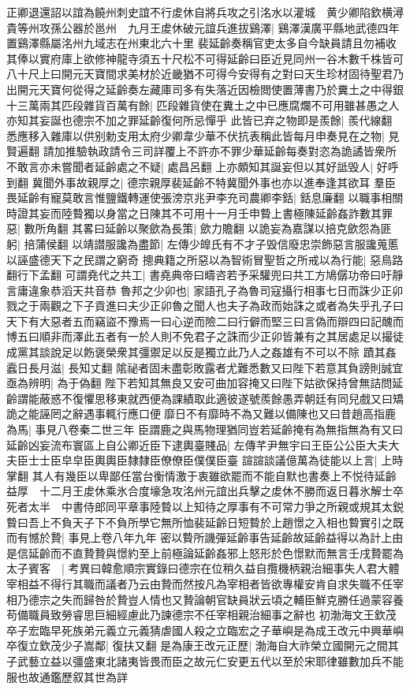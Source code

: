 正卿退還詔以誼為饒州刺史誼不行䖍休自將兵攻之引洺水以灌城　黄少卿陷欽横潯貴等州攻孫公器於邕州　九月王䖍休破元誼兵進拔鷄澤|{
	鷄澤漢廣平縣地武德四年置鷄澤縣屬洺州九域志在州東北六十里}
裴延齡奏稱官吏太多自今缺員請且勿補收其俸以實府庫上欲修神龍寺須五十尺松不可得延齡曰臣近見同州一谷木數千株皆可八十尺上曰開元天寶間求美材於近畿猶不可得今安得有之對曰天生珍材固待聖君乃出開元天寶何從得之延齡奏左藏庫司多有失落近因檢閲使置薄書乃於糞土之中得銀十三萬兩其匹段雜貨百萬有餘|{
	匹段雜貨使在糞土之中已應腐爛不可用雖甚愚之人亦知其妄誕也德宗不加之罪延齡復何所忌憚乎}
此皆已弃之物即是羨餘|{
	羨代線翻}
悉應移入雜庫以供别勅支用太府少卿韋少華不伏抗表稱此皆每月申奏見在之物|{
	見賢遍翻}
請加推驗執政請令三司詳覆上不許亦不罪少華延齡每奏對恣為詭譎皆衆所不敢言亦未嘗聞者延齡處之不疑|{
	處昌呂翻}
上亦頗知其誕妄但以其好詆毁人|{
	好呼到翻}
冀聞外事故親厚之|{
	德宗親厚裴延齡不特冀聞外事也亦以進奉逢其欲耳}
羣臣畏延齡有寵莫敢言惟鹽鐵轉運使張滂京兆尹李充司農卿李銛|{
	銛息廉翻}
以職事相關時證其妄而陸䞇獨以身當之日陳其不可用十一月壬申䞇上書極陳延齡姦詐數其罪惡|{
	數所角翻}
其畧曰延齡以聚歛為長策|{
	歛力贍翻}
以詭妄為嘉謀以掊克歛怨為匪躬|{
	掊蒲侯翻}
以靖譛服讒為盡節|{
	左傳少皥氏有不才子毁信廢忠崇飾惡言服讒蒐慝以誣盛德天下之民謂之窮奇}
摠典籍之所惡以為智術冒聖哲之所戒以為行能|{
	惡鳥路翻行下孟翻}
可謂堯代之共工|{
	書堯典帝曰疇咨若予采驩兜曰共工方鳩僝功帝曰吁靜言庸違象恭滔天共音恭}
魯邦之少卯也|{
	家語孔子為魯司寇攝行相事七日而誅少正卯戮之于兩觀之下子貢進曰夫少正卯魯之聞人也夫子為政而始誅之或者為失乎孔子曰天下有大惡者五而竊盜不豫焉一曰心逆而險二曰行僻而堅三曰言偽而辯四曰記醜而博五曰順非而澤此五者有一於人則不免君子之誅而少正卯皆兼有之其居處足以撮徒成黨其談說足以飭褒榮衆其彊禦足以反是獨立此乃人之姦雄有不可以不除}
蹟其姦蠧日長月滋|{
	長知丈翻}
隂祕者固未盡彰敗露者尤難悉數又曰陛下若意其負謗則誠宜亟為辨明|{
	為于偽翻}
陛下若知其無良又安可曲加容掩又曰陛下姑欲保持曾無詰問延齡謂能蔽惑不復懼思移東就西便為課績取此適彼遂號羨餘愚弄朝廷有同兒戲又曰矯詭之能誣罔之辭遇事輒行應口便靡日不有靡時不為又難以備陳也又曰昔趙高指鹿為馬|{
	事見八卷秦二世三年}
臣謂鹿之與馬物理猶同豈若延齡掩有為無指無為有又曰延齡凶妄流布寰區上自公卿近臣下逮輿臺賤品|{
	左傳芊尹無宇曰王臣公公臣大夫大夫臣士士臣皁皁臣輿輿臣隸隸臣僚僚臣僕僕臣臺}
諠諠談議億萬為徒能以上言|{
	上時掌翻}
其人有幾臣以卑鄙任當台衡情激于衷雖欲罷而不能自默也書奏上不悦待延齡益厚　十二月王䖍休乘氷合度壕急攻洺州元誼出兵擊之䖍休不勝而返日暮氷解士卒死者太半　中書侍郎同平章事陸䞇以上知待之厚事有不可常力爭之所親或規其太鋭䞇曰吾上不負天子下不負所學它無所恤裴延齡日短䞇於上趙憬之入相也䞇實引之既而有憾於贄|{
	事見上卷八年九年}
密以䞇所譏彈延齡事告延齡故延齡益得以為計上由是信延齡而不直贄贄與憬約至上前極論延齡姦邪上怒形於色憬默而無言壬戌贄罷為太子賓客　|{
	考異曰韓愈順宗實錄曰德宗在位稍久益自攬機柄親治細事失人君大體宰相益不得行其職而議者乃云由贄而然按凡為宰相者皆欲專權安肯自求失職不任宰相乃德宗之失而歸咎於贄豈人情也又贄論朝官缺員狀云頃之輔臣鮮克勝任過蒙容養苟備職員致勞睿思巨細經慮此乃諫德宗不任宰相親治細事之辭也}
初渤海文王欽茂卒子宏臨早死族弟元義立元義猜虐國人殺之立臨宏之子華嶼是為成王改元中興華嶼卒復立欽茂少子嵩鄰|{
	復扶又翻}
是為康王改元正歷|{
	渤海自大祚榮立國開元之間其子武藝立益以彊盛東北諸夷皆畏而臣之故元仁安更五代以至於宋耶律雖數加兵不能服也故通鑑歷叙其世為詳}



